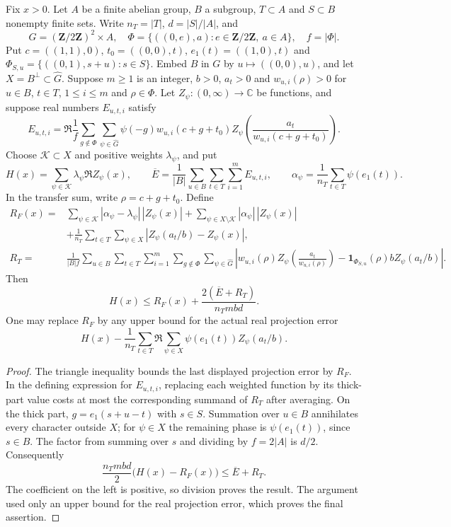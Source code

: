 \begin{proposition}\label{cs-finite-average}
Fix $x>0$. Let $A$ be a finite abelian group, $B$ a subgroup, $T\subset A$ and
$S\subset B$ nonempty finite sets. Write $n_T=|T|$, $d=|S|/|A|$, and
\[
 G=(\mathbf Z/2\mathbf Z)^2\times A,\quad
 \Phi=\{((0,e),a):e\in\mathbf Z/2\mathbf Z,\ a\in A\},\quad
 f=|\Phi|.
\]
Put $c=((1,1),0)$, $t_0=((0,0),t)$, $e_1(t)=((1,0),t)$ and
$\Phi_{S,u}=\{((0,1),s+u):s\in S\}$. Embed $B$ in $G$ by
$u\mapsto((0,0),u)$, and let
$X=B^\perp\subset\widehat G$.
Suppose $m\ge1$ is an integer, $b>0$, $a_t>0$ and $w_{u,i}(\rho)>0$ for
$u\in B$, $t\in T$, $1\le i\le m$ and $\rho\in\Phi$.
Let $Z_\psi:(0,\infty)\to\mathbb C$ be functions, and suppose real
numbers $E_{u,t,i}$ satisfy
\[
 E_{u,t,i}=\Re\frac1f\sum_{g\notin\Phi}\sum_{\psi\in\widehat G}
       \psi(-g)w_{u,i}(c+g+t_0)
          Z_\psi\!\left(\frac{a_t}{w_{u,i}(c+g+t_0)}\right).
\]
Choose $\mathcal K\subset X$ and positive weights $\lambda_\psi$, and put
\[
 H(x)=\sum_{\psi\in\mathcal K}\lambda_\psi\Re Z_\psi(x),\qquad
 \overline E=\frac1{|B|}\sum_{u\in B}\sum_{t\in T}\sum_{i=1}^m E_{u,t,i},
 \qquad
 \alpha_\psi=\frac1{n_T}\sum_{t\in T}\psi(e_1(t)).
\]
In the transfer sum, write $\rho=c+g+t_0$. Define
\begin{align*}
 R_F(x)={}&\sum_{\psi\in\mathcal K}|\alpha_\psi-\lambda_\psi|\,|Z_\psi(x)|
       +\sum_{\psi\in X\setminus\mathcal K}|\alpha_\psi|\,|Z_\psi(x)|\\
 &+\frac1{n_T}\sum_{t\in T}\sum_{\psi\in X}
             |Z_\psi(a_t/b)-Z_\psi(x)|,\\
 R_T={}&\frac1{|B|f}\sum_{u\in B}\sum_{t\in T}\sum_{i=1}^m
           \sum_{g\notin\Phi}\sum_{\psi\in\widehat G}
 \left|w_{u,i}(\rho)Z_\psi\!\left(\frac{a_t}{w_{u,i}(\rho)}\right)
   -\mathbf1_{\Phi_{S,u}}(\rho)bZ_\psi(a_t/b)\right|.
\end{align*}
Then
\[
                H(x)\le R_F(x)+\frac{2(\overline E+R_T)}{n_Tmbd}.
\]
One may replace $R_F$ by any upper bound for the actual real projection
error
\[
 H(x)-\frac1{n_T}\sum_{t\in T}
          \Re\sum_{\psi\in X}\psi(e_1(t))Z_\psi(a_t/b).
\]
\end{proposition}
\begin{proof}
The triangle inequality bounds the last displayed projection error by
$R_F$. In the defining expression for $E_{u,t,i}$, replacing each weighted
function by its thick-part value costs at most the corresponding summand
of $R_T$ after averaging. On the thick part,
$g=e_1(s+u-t)$ with $s\in S$.
Summation over $u\in B$ annihilates every character outside $X$; for
$\psi\in X$ the remaining phase is $\psi(e_1(t))$, since $s\in B$.
The factor from summing over $s$ and dividing by $f=2|A|$ is $d/2$.
Consequently
\[
 \frac{n_Tmbd}{2}\bigl(H(x)-R_F(x)\bigr)
        \le\overline E+R_T.
\]
The coefficient on the left is positive, so division proves the result.
The argument used only an upper bound for the real projection error,
which proves the final assertion.
\end{proof}


